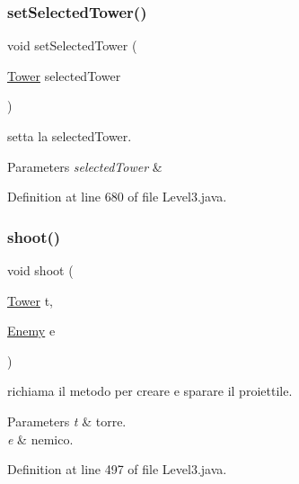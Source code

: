\subsubsection{\texorpdfstring{set\+Selected\+Tower()}{setSelectedTower()}}
{\footnotesize\ttfamily void set\+Selected\+Tower (\begin{DoxyParamCaption}\item[{\hyperlink{classtowers_1_1_tower}{Tower}}]{selected\+Tower }\end{DoxyParamCaption})}



setta la selected\+Tower. 


\begin{DoxyParams}{Parameters}
{\em selected\+Tower} & \\
\hline
\end{DoxyParams}


Definition at line 680 of file Level3.\+java.

\mbox{\label{classscenes_1_1_level3_a200b073564fc341f34b6112718742bae}} 
\subsubsection{\texorpdfstring{shoot()}{shoot()}}
{\footnotesize\ttfamily void shoot (\begin{DoxyParamCaption}\item[{\hyperlink{classtowers_1_1_tower}{Tower}}]{t,  }\item[{\hyperlink{classenemies_1_1_enemy}{Enemy}}]{e }\end{DoxyParamCaption})}



richiama il metodo per creare e sparare il proiettile. 


\begin{DoxyParams}{Parameters}
{\em t} & torre. \\
\hline
{\em e} & nemico. \\
\hline
\end{DoxyParams}


Definition at line 497 of file Level3.\+java.

